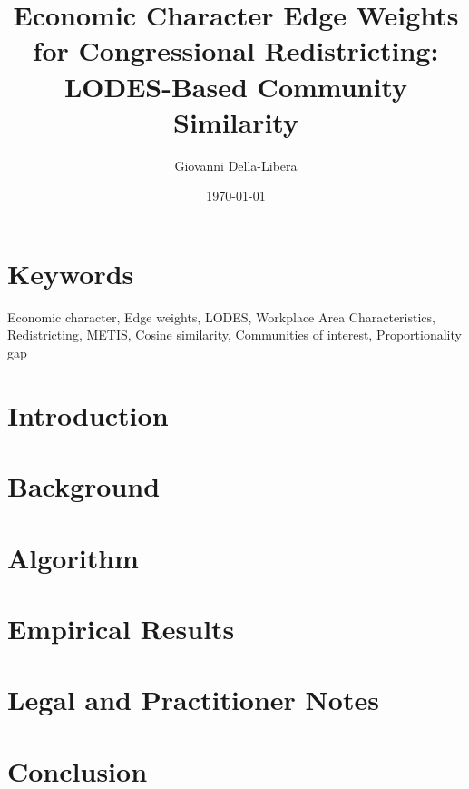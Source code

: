 \documentclass[12pt]{article}
\title{\textbf{Economic Character Edge Weights for Congressional Redistricting:\\
LODES-Based Community Similarity}}
\author{Giovanni Della-Libera}
\date{\today}
\begin{document}
\maketitle

\begin{abstract}

\end{abstract}

\section*{Keywords}
Economic character, Edge weights, LODES, Workplace Area Characteristics,
Redistricting, METIS, Cosine similarity, Communities of interest, Proportionality gap

\section{Introduction}


\section{Background}


\section{Algorithm}


\section{Empirical Results}


\section{Legal and Practitioner Notes}


\section{Conclusion}




\end{document}
